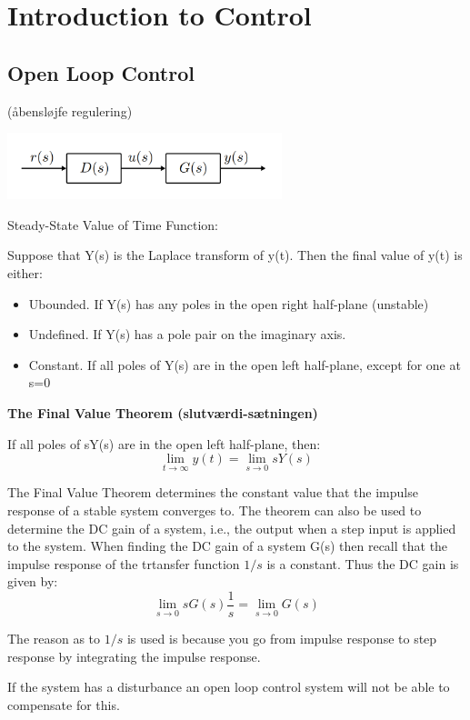 \section{Introduction to Control}

\subsection{Open Loop Control}
(åbensløjfe regulering)

\begin{center}
	\includegraphics[width=0.6\textwidth]{Images/openLoopControl.png}
\end{center}


Steady-State Value of Time Function:

Suppose that Y(s) is the Laplace transform of y(t). Then the final value of y(t) is either:
\begin{itemize}
	\item{Ubounded. If Y(s) has any poles in the open right half-plane (unstable)}
	\item{Undefined. If Y(s) has a pole pair on the imaginary axis.}
	\item{Constant. If all poles of Y(s) are in the open left half-plane, except for one at s=0}
\end{itemize}

\textbf{The Final Value Theorem (slutværdi-sætningen)}

If all poles of sY(s) are in the open left half-plane, then:
$$\lim_{t \to \infty} y(t) = \lim_{s \to 0} sY(s)$$

The Final Value Theorem determines the constant value that the impulse response of a stable system converges to.
The theorem can also be used to determine the DC gain of a system, i.e., the output when a step input is applied to the system.
When finding the DC gain of a system G(s) then recall that the impulse response of the trtansfer function $1/s$ is a constant. Thus the DC gain is given by:
$$\lim_{s \to 0} sG(s)\frac{1}{s} = \lim_{s \to 0} G(s)$$

The reason as to $1/s$ is used is because you go from impulse response to step response by integrating the impulse response.

If the system has a disturbance an open loop control system will not be able to compensate for this.

